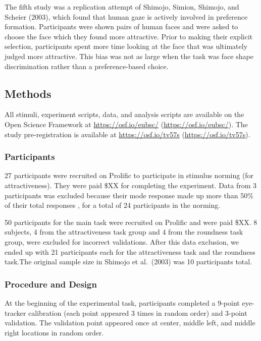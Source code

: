 \documentclass[
  man,floatsintext]{apa6}
\begin{document}
The fifth study was a replication attempt of Shimojo, Simion, Shimojo, and Scheier (2003), which found that human gaze is actively involved in preference formation. Participants were shown pairs of human faces and were asked to choose the face which they found more attractive. Prior to making their explicit selection, participants spent more time looking at the face that was ultimately judged more attractive. This bias was not as large when the task was face shape discrimination rather than a preference-based choice.

\hypertarget{methods-4}{%
\subsection{Methods}\label{methods-4}}

All stimuli, experiment scripts, data, and analysis scripts are available on the Open Science Framework at \url{https://osf.io/eubsc/} (\url{https://osf.io/eubsc/}). The study pre-registration is available at \url{https://osf.io/tv57s} (\url{https://osf.io/tv57s}).

\hypertarget{participants-5}{%
\subsubsection{Participants}\label{participants-5}}

27 participants were recruited on Prolific to participate in stimulus norming (for attractiveness). They were paid \$XX for completing the experiment. Data from 3 participants was excluded because their mode response made up more than 50\% of their total responses , for a total of 24 participants in the norming.

50 participants for the main task were recruited on Prolific and were paid \$XX. 8 subjects, 4 from the attractiveness task group and 4 from the roundness task group, were excluded for incorrect validations. After this data exclusion, we ended up with 21 participants each for the attractiveness task and the roundness task.The original sample size in Shimojo et al.~(2003) was 10 participants total.

\hypertarget{procedure-and-design}{%
\subsubsection{Procedure and Design}\label{procedure-and-design}}

At the beginning of the experimental task, participants completed a 9-point eye-tracker calibration (each point appeared 3 times in random order) and 3-point validation. The validation point appeared once at center, middle left, and middle right locations in random order.
\end{document}

